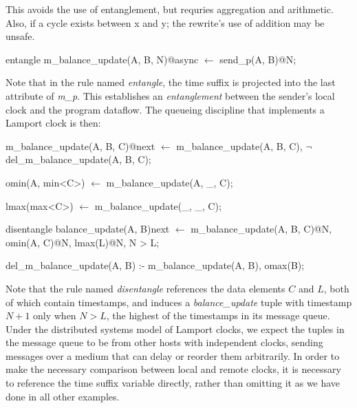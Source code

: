 This avoids the use of entanglement, but requries aggregation and
arithmetic.  Also, if a cycle exists between x and y; the rewrite's
use of addition may be unsafe.


\begin{Dedalus}
entangle
m\_balance\_update(A, B, N)@async \(\leftarrow\)
  send\_p(A, B)@N;
\end{Dedalus}

Note that in the rule named \emph{entangle}, the time suffix is projected into the last attribute of \emph{m\_p}.  
This establishes an \emph{entanglement} between
the sender's local clock and the program dataflow.  The queueing discipline that implements a
Lamport clock is then:

\begin{Dedalus}

m\_balance\_update(A, B, C)@next \(\leftarrow\)
  m\_balance\_update(A, B, C),
  \(\lnot\) del\_m\_balance\_update(A, B, C);

omin(A, min<C>) \(\leftarrow\)
  m\_balance\_update(A, _, C);

lmax(max<C>) \(\leftarrow\)
  m\_balance\_update(_, _, C);

disentangle
balance_update(A, B)next \(\leftarrow\)
  m\_balance\_update(A, B, C)@N,
  omin(A, C)@N,
  lmax(L)@N,
  N > L;

del\_m\_balance\_update(A, B) :-
  m\_balance\_update(A, B),
  omax(B);
  
\end{Dedalus}

Note that the rule named \emph{disentangle} references the data elements $C$ and $L$, both of which
contain timestamps, and induces a \emph{balance\_update} tuple with timestamp $N+1$ only when $N > L$,
the highest of the timestamps in its message queue.  Under the distributed systems model of Lamport clocks, 
we expect the tuples in the message queue to  be from other hosts with independent clocks, sending messages 
over a medium that can delay or reorder them arbitrarily.  In order to make the necessary comparison between local
and remote clocks, it is necessary to reference the time suffix variable directly, rather than omitting it as we have done 
in all other \lang examples.



